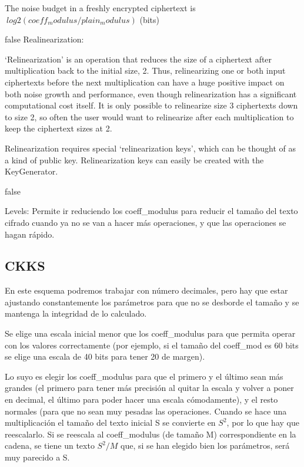 The noise budget in a freshly encrypted ciphertext is $~ log2(coeff_modulus/plain_modulus)$  (bits)


\if false
Realinearization:

`Relinearization' is an operation that reduces the size of a ciphertext after
    multiplication back to the initial size, 2. Thus, relinearizing one or both
    input ciphertexts before the next multiplication can have a huge positive
    impact on both noise growth and performance, even though relinearization has
    a significant computational cost itself. It is only possible to relinearize
    size 3 ciphertexts down to size 2, so often the user would want to relinearize
    after each multiplication to keep the ciphertext sizes at 2.

    Relinearization requires special `relinearization keys', which can be thought
    of as a kind of public key. Relinearization keys can easily be created with
    the KeyGenerator.

\fi

\if false

Levels: Permite ir reduciendo los coeff\_modulus para reducir el tamaño del texto cifrado cuando ya no se van a hacer más operaciones, y que las operaciones se hagan rápido.

\fi

\subsection{CKKS}

En este esquema podremos trabajar con número decimales, pero hay que estar ajustando constantemente los parámetros para que no se desborde el tamaño y se mantenga la integridad de lo calculado.

Se elige una escala inicial menor que los coeff\_modulus para que permita operar con los valores correctamente (por ejemplo, si el tamaño del coeff\_mod es 60 bits se elige una escala de 40 bits para tener 20 de margen).

Lo suyo es elegir los coeff\_modulus para que el primero y el último sean más grandes (el primero para tener más precisión al quitar la escala y volver a poner en decimal, el último para poder hacer una escala cómodamente), y el resto normales (para que no sean muy pesadas las operaciones. Cuando se hace una multiplicación el tamaño del texto inicial S se convierte en $S^2$, por lo que hay que reescalarlo. Si se reescala al coeff\_modulus (de tamaño M) correspondiente en la cadena, se tiene un texto $S^2/M$ que, si se han elegido bien los parámetros, será muy parecido a S.

